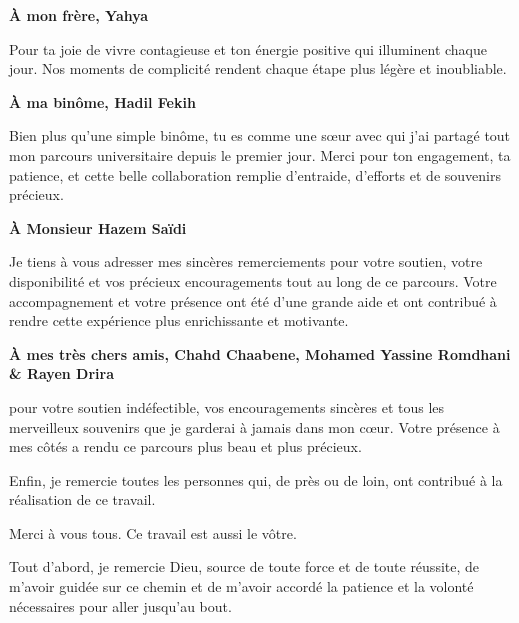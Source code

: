 \vspace{0.3cm}

{\centering
\textbf{\large À mon frère, Yahya}\par
}

Pour ta joie de vivre contagieuse et ton énergie positive qui illuminent chaque jour. Nos moments de complicité rendent chaque étape plus légère et inoubliable.

\vspace{0.3cm}

\newpage


{\centering
\textbf{\large À ma binôme, Hadil Fekih}\par
}

Bien plus qu'une simple binôme, tu es comme une sœur avec qui j'ai partagé tout mon parcours universitaire depuis le premier jour. Merci pour ton engagement, ta patience, et cette belle collaboration remplie d'entraide, d'efforts et de souvenirs précieux.

\vspace{0.3cm}

{\centering
\textbf{\large À Monsieur Hazem Saïdi}\par
}

Je tiens à vous adresser mes sincères remerciements pour votre soutien, votre disponibilité et vos précieux encouragements tout au long de ce parcours. Votre accompagnement et votre présence ont été d’une grande aide et ont contribué à rendre cette expérience plus enrichissante et motivante.

\vspace{0.3cm}

{\centering
\textbf{\large À mes très chers amis, Chahd Chaabene, Mohamed Yassine Romdhani \& Rayen Drira}\par
}

pour votre soutien indéfectible, vos encouragements sincères et tous les merveilleux souvenirs que je garderai à jamais dans mon cœur. Votre présence à mes côtés a rendu ce parcours plus beau et plus précieux.
\vspace{0.3cm}

Enfin, je remercie toutes les personnes qui, de près ou de loin, ont contribué à la réalisation de ce travail.

\vspace{0.5cm}

Merci à vous tous. Ce travail est aussi le vôtre.
\newpage

Tout d’abord, je remercie Dieu, source de toute force et de toute réussite, de m’avoir guidée sur ce chemin et de m’avoir accordé la patience et la volonté nécessaires pour aller jusqu’au bout.


